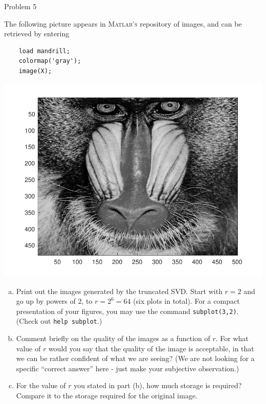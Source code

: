 \begin{section}{Problem 5}
    \begin{problem}{5}
        The following picture appears in \textsc{Matlab's} repository of images, and can be retrieved by entering 
        \begin{verbatim}
    load mandrill; 
    colormap('gray'); 
    image(X);
        \end{verbatim}
        \begin{center}
            \includegraphics[scale=0.7]{mandrill2.pdf}
        \end{center}
        
        \begin{enumerate}[(a)]
            \item Print out the images generated by the truncated SVD. Start with $r=2$ and go up by powers of $2$, to $r=2^6=64$ (six plots in total). For a compact presentation of your figures, you may use the command {\tt subplot(3,2)}. (Check out {\tt help subplot}.)        
            \item Comment briefly on the quality of the images as a function of $r$. For what value of $r$ would you say that the quality of the image is acceptable, in that we can be rather confident of what we are seeing? (We are not looking for a specific ``correct answer'' here - just make your subjective observation.)
            \item For the value of $r$ you stated in part (b), how much storage is required? Compare it to the storage required for the original image.
        \end{enumerate}
    \end{problem}


\end{section}
